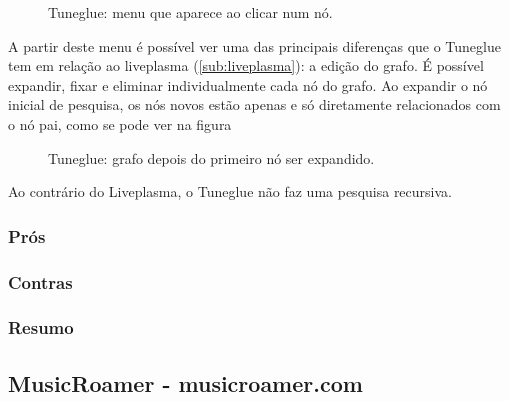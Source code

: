 \begin{figure}[tb]
  \begin{center}
  \end{center}
  \caption{Tuneglue: menu que aparece ao clicar num nó.}
  \label{fig:sota_tuneglue}
\end{figure}

A partir deste menu é possível ver uma das principais diferenças que o Tuneglue tem em relação ao liveplasma (\ref{sub:liveplasma}): a edição do grafo.
É possível expandir, fixar e eliminar individualmente cada nó do grafo.
Ao expandir o nó inicial de pesquisa, os nós novos estão apenas e só diretamente relacionados com o nó pai, como se pode ver na figura %

\begin{figure}[tb]
  \begin{center}
  \end{center}
  \caption{Tuneglue: grafo depois do primeiro nó ser expandido.}
  \label{fig:figure1}
\end{figure}

Ao contrário do Liveplasma, o Tuneglue não faz uma pesquisa recursiva.

\subsubsection{Prós} %
\label{ssub:audiomap_pros}


\subsubsection{Contras} %
\label{ssub:audiomap_contras}


\subsubsection{Resumo} %
\label{ssub:audiomap_resumo}



\subsection{MusicRoamer - musicroamer.com} %
\label{sub:musicroamer}



